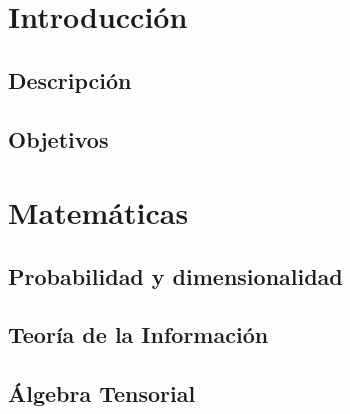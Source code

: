 \documentclass[ oneside,openany,titlepage,numbers=noenddot,headinclude,%
                footinclude=true,cleardoublepage=empty,abstractoff, %
                BCOR=5mm,paper=a4,fontsize=11pt,%
                spanish,american%
                ]{scrreprt}
\begin{document}
\frenchspacing
\raggedbottom
{} %
\pagestyle{plain}
%


\cleardoublepage
\cleardoublepage
\cleardoublepage
\cleardoublepage
\pagestyle{scrheadings}
\cleardoublepage
\cleardoublepage{}
\cleardoublepage

\part{Introducción}

\chapter{Descripción}


\chapter{Objetivos}


\part{Matemáticas}
\chapter{Probabilidad y dimensionalidad}\label{ch:probability}


\chapter{Teoría de la Información}\label{ch:information}


\chapter{Álgebra Tensorial}\label{ch:tensors}

\end{document}
